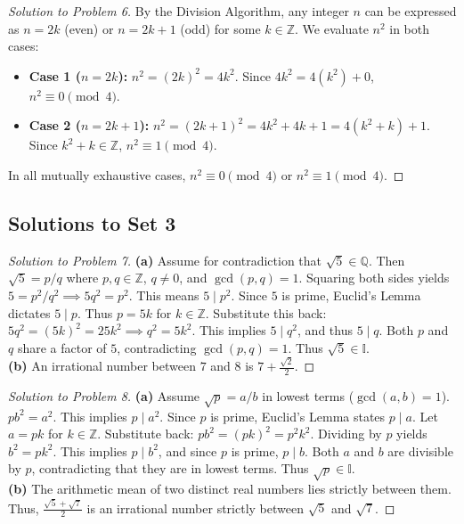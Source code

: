 \documentclass{article}
\begin{document}
\begin{proof}[Solution to Problem 6]
By the Division Algorithm, any integer $n$ can be expressed as $n = 2k$ (even) or $n = 2k+1$ (odd) for some $k \in \mathbb{Z}$. We evaluate $n^2$ in both cases:
\begin{itemize}
    \item \textbf{Case 1 ($n = 2k$):} $n^2 = (2k)^2 = 4k^2$. Since $4k^2 = 4(k^2) + 0$, $n^2 \equiv 0 \pmod 4$.
    \item \textbf{Case 2 ($n = 2k+1$):} $n^2 = (2k+1)^2 = 4k^2 + 4k + 1 = 4(k^2+k) + 1$. Since $k^2+k \in \mathbb{Z}$, $n^2 \equiv 1 \pmod 4$.
\end{itemize}
In all mutually exhaustive cases, $n^2 \equiv 0 \pmod 4$ or $n^2 \equiv 1 \pmod 4$. 
\end{proof}

\subsection{Solutions to Set 3}
\begin{proof}[Solution to Problem 7]
\textbf{(a)} Assume for contradiction that $\sqrt{5} \in \mathbb{Q}$. Then $\sqrt{5} = p/q$ where $p,q \in \mathbb{Z}$, $q \neq 0$, and $\gcd(p,q)=1$. Squaring both sides yields $5 = p^2/q^2 \implies 5q^2 = p^2$. This means $5 \mid p^2$. Since $5$ is prime, Euclid's Lemma dictates $5 \mid p$. Thus $p = 5k$ for $k \in \mathbb{Z}$. Substitute this back: $5q^2 = (5k)^2 = 25k^2 \implies q^2 = 5k^2$. This implies $5 \mid q^2$, and thus $5 \mid q$. Both $p$ and $q$ share a factor of $5$, contradicting $\gcd(p,q)=1$. Thus $\sqrt{5} \in \mathbb{I}$. \\
\textbf{(b)} An irrational number between $7$ and $8$ is $7 + \frac{\sqrt{2}}{2}$.
\end{proof}

\begin{proof}[Solution to Problem 8]
\textbf{(a)} Assume $\sqrt{p} = a/b$ in lowest terms ($\gcd(a,b)=1$). $pb^2 = a^2$. This implies $p \mid a^2$. Since $p$ is prime, Euclid's Lemma states $p \mid a$. Let $a = pk$ for $k \in \mathbb{Z}$. Substitute back: $pb^2 = (pk)^2 = p^2k^2$. Dividing by $p$ yields $b^2 = pk^2$. This implies $p \mid b^2$, and since $p$ is prime, $p \mid b$. Both $a$ and $b$ are divisible by $p$, contradicting that they are in lowest terms. Thus $\sqrt{p} \in \mathbb{I}$. \\
\textbf{(b)} The arithmetic mean of two distinct real numbers lies strictly between them. Thus, $\frac{\sqrt{5} + \sqrt{7}}{2}$ is an irrational number strictly between $\sqrt{5}$ and $\sqrt{7}$.
\end{proof}
\end{document}
